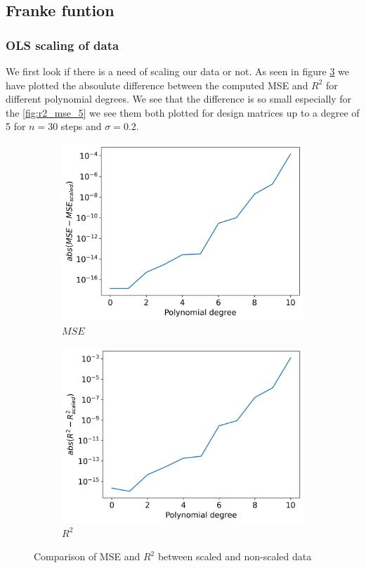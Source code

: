 \documentclass[12pt]{article}
\begin{document}
\subsection{Franke funtion}
\subsubsection{OLS scaling of data}
We first look if there is a need of scaling our data or not. As seen in figure \ref{fig:compare_scale} we have plotted the absoulute difference between the computed MSE and $R^2$ for different polynomial degrees. We see that the difference is so small especially for the
\ref{fig:r2_mse_5} we see them both plotted for design matrices up to a degree of 5 for $n=30$ steps and $\sigma=0.2$.
\begin{figure}[H]
  \begin{subfigure}{.5\textwidth}
    \centering
    \includegraphics[width=\textwidth]{../figures/compare_scale_mse.png}
    \caption{$MSE$}
    \label{fig:}
  \end{subfigure}
  \begin{subfigure}{.5\textwidth}
    \centering
    \includegraphics[width=\textwidth]{../figures/compare_scale_r2.png}
    \caption{$R^2$}
    \label{fig:}
  \end{subfigure}
  \caption{Comparison of MSE and $R^2$ between scaled and non-scaled data}
  \label{fig:compare_scale}
\end{figure}
\end{document}
